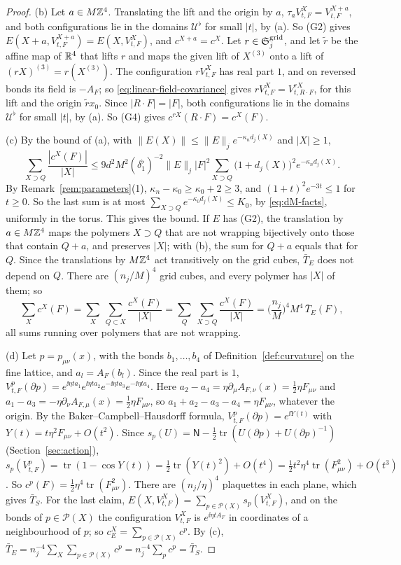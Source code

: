 \begin{proof}
(b) Let $a\in M\mathbb Z^4$. Translating the lift and the origin by $a$, $\tau_aV^X_{t,F}=V^{X+a}_{t,F}$, and both configurations lie in the domains $\mathcal U^\flat$ for small $|t|$, by (a). So (G2) gives $E(X+a,V^{X+a}_{t,F})=E(X,V^X_{t,F})$, and $c^{X+a}=c^X$. Let $r\in\mathfrak S^{\rm grid}_j$, and let $\tilde r$ be the affine map of $\mathbb R^4$ that lifts $r$ and maps the given lift of $X^{(3)}$ onto a lift of $(rX)^{(3)}=r(X^{(3)})$. The configuration $rV^X_{t,F}$ has real part $1$, and on reversed bonds its field is $-A_F$; so \eqref{eq:linear-field-covariance} gives $rV^X_{t,F}=V^{rX}_{t,R\cdot F}$, for this lift and the origin $\tilde rx_0$. Since $|R\cdot F|=|F|$, both configurations lie in the domains $\mathcal U^\flat$ for small $|t|$, by (a). So (G4) gives $c^{rX}(R\cdot F)=c^X(F)$.

(c) By the bound of (a), with $\|E(X)\|\le\|E\|_je^{-\kappa_nd_j(X)}$ and $|X|\ge1$,
\[
\sum_{X\supset Q}\frac{|c^X(F)|}{|X|}\le9d^2M^2(\delta_1^\flat)^{-2}\|E\|_j|F|^2\sum_{X\supset Q}\big(1+d_j(X)\big)^2e^{-\kappa_nd_j(X)} .
\]
By Remark~\ref{rem:parameters}(1), $\kappa_n-\kappa_0\ge\kappa_0+2\ge3$, and $(1+t)^2e^{-3t}\le1$ for $t\ge0$. So the last sum is at most $\sum_{X\supset Q}e^{-\kappa_0d_j(X)}\le K_0$, by \eqref{eq:dM-facts}, uniformly in the torus. This gives the bound. If $E$ has (G2), the translation by $a\in M\mathbb Z^4$ maps the polymers $X\supset Q$ that are not wrapping bijectively onto those that contain $Q+a$, and preserves $|X|$; with (b), the sum for $Q+a$ equals that for $Q$. Since the translations by $M\mathbb Z^4$ act transitively on the grid cubes, $\bar T_E$ does not depend on $Q$. There are $(n_j/M)^4$ grid cubes, and every polymer has $|X|$ of them; so
\[
\sum_Xc^X(F)=\sum_X\ \sum_{Q\subset X}\frac{c^X(F)}{|X|}=\sum_Q\ \sum_{X\supset Q}\frac{c^X(F)}{|X|}=\Big(\frac{n_j}M\Big)^4M^4\,\bar T_E(F),
\]
all sums running over polymers that are not wrapping.

(d) Let $p=p_{\mu\nu}(x)$, with the bonds $b_1,\dots,b_4$ of Definition~\ref{def:curvature} on the fine lattice, and $a_l=A_F(b_l)$. Since the real part is $1$, $V^p_{t,F}(\partial p)=e^{\ii\eta ta_1}e^{\ii\eta ta_2}e^{-\ii\eta ta_3}e^{-\ii\eta ta_4}$. Here $a_2-a_4=\eta\partial_\mu A_{F,\nu}(x)=\frac12\eta F_{\mu\nu}$ and $a_1-a_3=-\eta\partial_\nu A_{F,\mu}(x)=\frac12\eta F_{\mu\nu}$, so $a_1+a_2-a_3-a_4=\eta F_{\mu\nu}$, whatever the origin. By the Baker--Campbell--Hausdorff formula, $V^p_{t,F}(\partial p)=e^{\ii Y(t)}$ with $Y(t)=t\eta^2F_{\mu\nu}+O(t^2)$. Since $s_p(U)=\mathsf N-\frac12\operatorname{tr}(U(\partial p)+U(\partial p)^{-1})$ (Section~\ref{sec:action}), $s_p(V^p_{t,F})=\operatorname{tr}(1-\cos Y(t))=\frac12\operatorname{tr}(Y(t)^2)+O(t^4)=\frac12t^2\eta^4\operatorname{tr}(F_{\mu\nu}^2)+O(t^3)$. So $c^p(F)=\frac12\eta^4\operatorname{tr}(F_{\mu\nu}^2)$. There are $(n_j/\eta)^4$ plaquettes in each plane, which gives $\bar T_S$. For the last claim, $E(X,V^X_{t,F})=\sum_{p\in\mathcal P(X)}s_p(V^X_{t,F})$, and on the bonds of $p\in\mathcal P(X)$ the configuration $V^X_{t,F}$ is $e^{\ii\eta tA_F}$ in coordinates of a neighbourhood of $p$; so $c^X_E=\sum_{p\in\mathcal P(X)}c^p$. By (c), $\bar T_E=n_j^{-4}\sum_X\sum_{p\in\mathcal P(X)}c^p=n_j^{-4}\sum_pc^p=\bar T_S$.
\end{proof}


